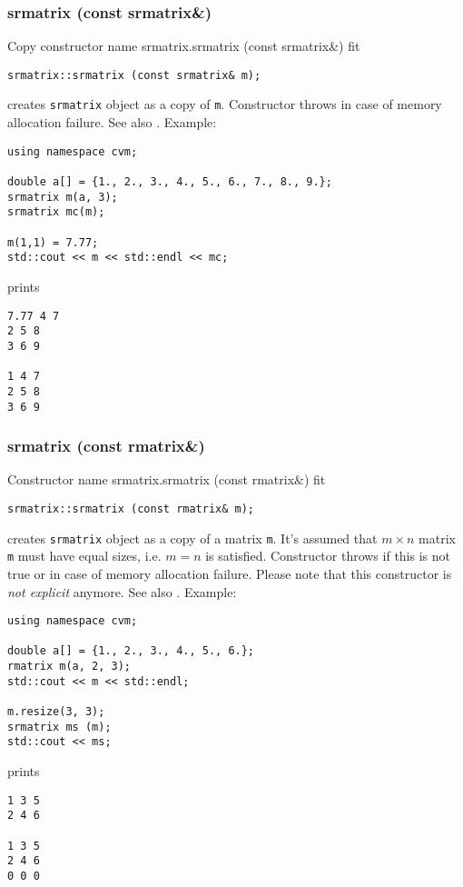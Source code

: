 \subsubsection{srmatrix (const srmatrix\&)}
Copy constructor%
\pdfdest name {srmatrix.srmatrix (const srmatrix&)} fit
\begin{verbatim}
srmatrix::srmatrix (const srmatrix& m);
\end{verbatim}
creates  \verb"srmatrix" object as a copy of \verb"m".
Constructor throws  
in case of memory allocation failure.
See also .
Example:
\begin{Verbatim}
using namespace cvm;

double a[] = {1., 2., 3., 4., 5., 6., 7., 8., 9.};
srmatrix m(a, 3);
srmatrix mc(m);

m(1,1) = 7.77;
std::cout << m << std::endl << mc;
\end{Verbatim}
prints
\begin{Verbatim}
7.77 4 7
2 5 8
3 6 9

1 4 7
2 5 8
3 6 9
\end{Verbatim}
\newpage



\subsubsection{srmatrix (const rmatrix\&)}
Constructor%
\pdfdest name {srmatrix.srmatrix (const rmatrix&)} fit
\begin{verbatim}
srmatrix::srmatrix (const rmatrix& m);
\end{verbatim}
creates  \verb"srmatrix" object as a copy of a matrix \verb"m".
It's assumed that $m\times n$ matrix \verb"m" must have equal
sizes, i.e. $m = n$ is satisfied.
Constructor throws  
if this is not true or in case of memory allocation failure.
Please note that this constructor is \emph{not explicit} anymore.
See also .
Example:
\begin{Verbatim}
using namespace cvm;

double a[] = {1., 2., 3., 4., 5., 6.};
rmatrix m(a, 2, 3);
std::cout << m << std::endl;

m.resize(3, 3);
srmatrix ms (m);
std::cout << ms;
\end{Verbatim}
prints
\begin{Verbatim}
1 3 5
2 4 6

1 3 5
2 4 6
0 0 0
\end{Verbatim}
\newpage



